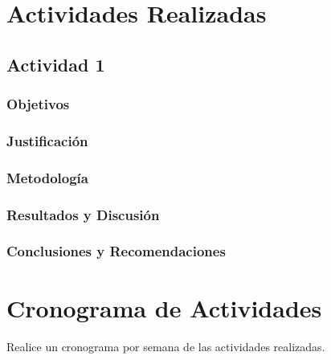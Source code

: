 \documentclass[a4paper]{article}
\begin{document}
\section{Actividades Realizadas}
\subsection{Actividad 1}
\subsubsection{Objetivos}
\subsubsection{Justificación}
\subsubsection{Metodología}
\subsubsection{Resultados y Discusión}
\subsubsection{Conclusiones y Recomendaciones}


\section{Cronograma de Actividades}
Realice un cronograma por semana de las actividades realizadas.
\end{document}
